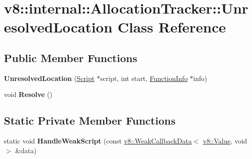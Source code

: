 \hypertarget{classv8_1_1internal_1_1_allocation_tracker_1_1_unresolved_location}{}\section{v8\+:\+:internal\+:\+:Allocation\+Tracker\+:\+:Unresolved\+Location Class Reference}
\label{classv8_1_1internal_1_1_allocation_tracker_1_1_unresolved_location}
\subsection*{Public Member Functions}
\begin{DoxyCompactItemize}
\item 
{\bfseries Unresolved\+Location} (\hyperlink{classv8_1_1internal_1_1_script}{Script} $\ast$script, int start, \hyperlink{structv8_1_1internal_1_1_allocation_tracker_1_1_function_info}{Function\+Info} $\ast$info)\hypertarget{classv8_1_1internal_1_1_allocation_tracker_1_1_unresolved_location_af3749f3261852e9a723abfeabc434e10}{}\label{classv8_1_1internal_1_1_allocation_tracker_1_1_unresolved_location_af3749f3261852e9a723abfeabc434e10}

\item 
void {\bfseries Resolve} ()\hypertarget{classv8_1_1internal_1_1_allocation_tracker_1_1_unresolved_location_a005bdeb8652b35def680e4c77d0b5439}{}\label{classv8_1_1internal_1_1_allocation_tracker_1_1_unresolved_location_a005bdeb8652b35def680e4c77d0b5439}

\end{DoxyCompactItemize}
\subsection*{Static Private Member Functions}
\begin{DoxyCompactItemize}
\item 
static void {\bfseries Handle\+Weak\+Script} (const \hyperlink{classv8_1_1_weak_callback_data}{v8\+::\+Weak\+Callback\+Data}$<$ \hyperlink{classv8_1_1_value}{v8\+::\+Value}, void $>$ \&data)\hypertarget{classv8_1_1internal_1_1_allocation_tracker_1_1_unresolved_location_aebaa5091cffc9b59b7e8ffe8f7c8a18b}{}\label{classv8_1_1internal_1_1_allocation_tracker_1_1_unresolved_location_aebaa5091cffc9b59b7e8ffe8f7c8a18b}

\end{DoxyCompactItemize}
